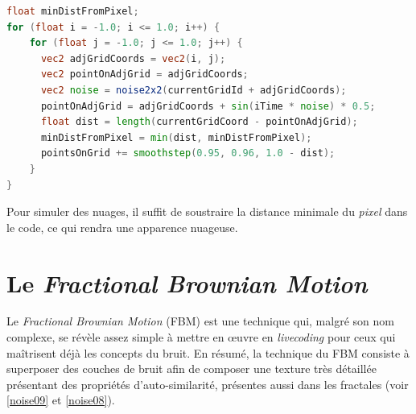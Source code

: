\begin{minipage}{\linewidth}
\begin{lstlisting}[language=GLSL, caption=Voronoi,captionpos=b,frame=single]
float minDistFromPixel;
for (float i = -1.0; i <= 1.0; i++) {
    for (float j = -1.0; j <= 1.0; j++) {
      vec2 adjGridCoords = vec2(i, j);
      vec2 pointOnAdjGrid = adjGridCoords;
      vec2 noise = noise2x2(currentGridId + adjGridCoords);
      pointOnAdjGrid = adjGridCoords + sin(iTime * noise) * 0.5;
      float dist = length(currentGridCoord - pointOnAdjGrid);
      minDistFromPixel = min(dist, minDistFromPixel);
      pointsOnGrid += smoothstep(0.95, 0.96, 1.0 - dist);
    }
}
\end{lstlisting}
\end{minipage}

Pour simuler des nuages, il suffit de soustraire la distance minimale du \textit{pixel} dans le code, ce qui rendra une apparence nuageuse.


\newpage


\section{Le \textit{Fractional Brownian Motion}}

Le \textit{Fractional Brownian Motion} (FBM) est une technique qui, malgré son nom complexe, se révèle assez simple à mettre en œuvre en \textit{livecoding} pour ceux qui maîtrisent déjà les concepts du bruit. En résumé, la technique du FBM consiste à superposer des couches de bruit afin de composer une texture très détaillée présentant des propriétés d'auto-similarité, présentes aussi dans les fractales (voir \ref{noise09} et \ref{noise08}).

